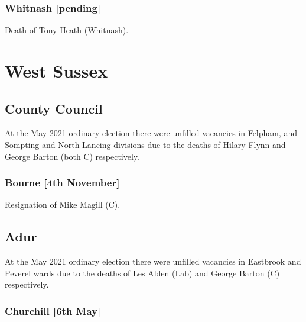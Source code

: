 \documentclass[a4paper,openany]{book}
\begin{document}
\begin{resultsiii}
\subsubsection*{Whitnash \hspace*{\fill}\nolinebreak[1]%
	\enspace\hspace*{\fill}
	[pending]}


Death of Tony Heath (Whitnash).

\section{West Sussex}

\subsection*{County Council}

At the May 2021 ordinary election there were unfilled vacancies in Felpham, and Sompting and North Lancing divisions due to the deaths of Hilary Flynn and George Barton (both C) respectively.

\subsubsection*{Bourne \hspace*{\fill}\nolinebreak[1]%
	\enspace\hspace*{\fill}
	[4th November]}


Resignation of Mike Magill (C).

\subsection*{Adur}

At the May 2021 ordinary election there were unfilled vacancies in Eastbrook and Peverel wards due to the deaths of Les Alden (Lab) and George Barton (C) respectively.

\subsubsection*{Churchill \hspace*{\fill}\nolinebreak[1]%
	\enspace\hspace*{\fill}
	[6th May]}


\end{resultsiii}
\end{document}
